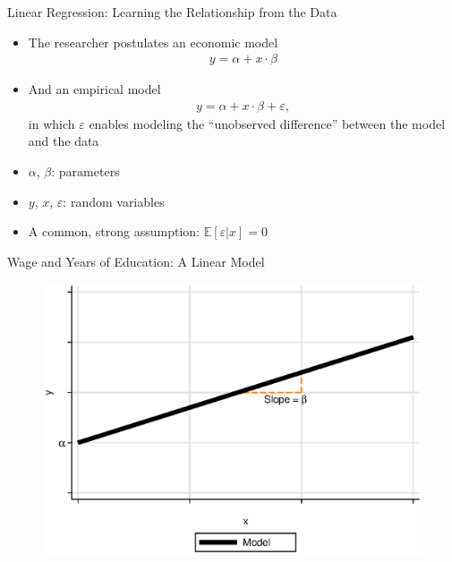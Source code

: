 \documentclass[static]{JJH-Beamer}
\begin{document}
\begin{frame}[noframenumbering]{Linear Regression: Learning the Relationship from the Data}
	\begin{itemize}
		\item The researcher postulates an economic model
			\begin{align}
				y = \alpha + x \cdot \beta \nonumber
			\end{align}
		\item And an empirical model
			\begin{align}
				y = \alpha + x \cdot \beta + \varepsilon, \nonumber
			\end{align}
		\noindent in which $\varepsilon$ enables modeling the ``unobserved difference'' between the model and the data
		\bigskip
		\item $\alpha$, $\beta$: parameters
		\item $y$, $x$, $\varepsilon$: random variables
		\bigskip
		\item A common, strong assumption: $\mathbb{E} \left[\varepsilon | x \right] = 0$
	\end{itemize}
\end{frame} 

\begin{frame}[noframenumbering]{Wage and Years of Education: A Linear Model}
\begin{figure}[H]
\centering
\includegraphics[width=.85\columnwidth]{linear_math}
\end{figure}
\end{frame} 
\end{document}
